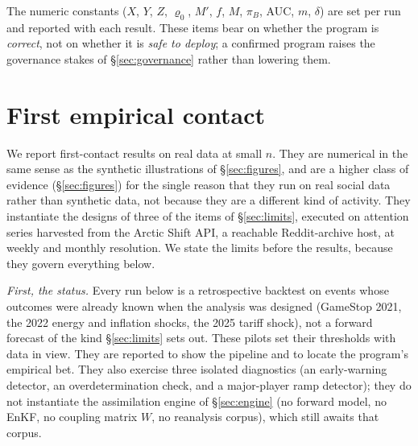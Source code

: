 \documentclass[11pt]{article}
\begin{document}
The numeric constants ($X$, $Y$, $Z$, $\varrho_0$, $M'$, $f$, $M$, $\pi_B$, AUC, $m$, $\delta$) are set per run and reported with each result. These items bear on whether the program is \emph{correct}, not on whether it is \emph{safe to deploy}; a confirmed program raises the governance stakes of \S\ref{sec:governance} rather than lowering them.

\section{First empirical contact}
\label{sec:empirical}

We report first-contact results on real data at small $n$. They are numerical in the same sense as the synthetic illustrations of \S\ref{sec:figures}, and are a higher class of evidence (\S\ref{sec:figures}) for the single reason that they run on real social data rather than synthetic data, not because they are a different kind of activity. They instantiate the designs of three of the items of \S\ref{sec:limits}, executed on attention series harvested from the Arctic Shift API, a reachable Reddit-archive host, at weekly and monthly resolution. We state the limits before the results, because they govern everything below.

\emph{First, the status.} Every run below is a retrospective backtest on events whose outcomes were already known when the analysis was designed (GameStop 2021, the 2022 energy and inflation shocks, the 2025 tariff shock), not a forward forecast of the kind \S\ref{sec:limits} sets out. These pilots set their thresholds with data in view. They are reported to show the pipeline and to locate the program's empirical bet. They also exercise three isolated diagnostics (an early-warning detector, an overdetermination check, and a major-player ramp detector); they do not instantiate the assimilation engine of \S\ref{sec:engine} (no forward model, no EnKF, no coupling matrix $W$, no reanalysis corpus), which still awaits that corpus.
\end{document}
